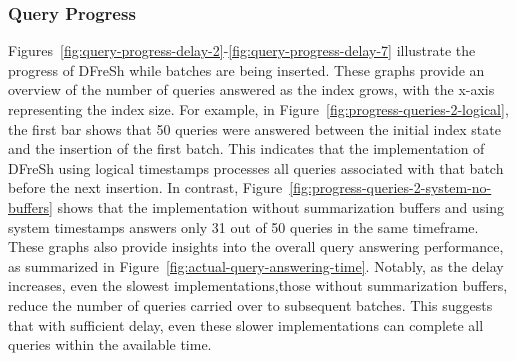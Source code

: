 \subsubsection{Query Progress}
Figures~\ref{fig:query-progress-delay-2}-\ref{fig:query-progress-delay-7} illustrate
the progress of DFreSh while batches are being inserted. These graphs provide an overview
of the number of queries answered as the index grows, with the x-axis representing the
index size.
%
For example, in Figure~\ref{fig:progress-queries-2-logical}, the first bar shows
that 50 queries were answered between the initial index state and the insertion of
the first batch. This indicates that the implementation of DFreSh using logical timestamps
processes all queries associated with that batch before the next insertion. In contrast,
Figure~\ref{fig:progress-queries-2-system-no-buffers} shows that the implementation
without summarization buffers and using system timestamps answers only 31 out of 50
queries in the same timeframe.
%
These graphs also provide insights into the overall query answering performance, as
summarized in Figure~\ref{fig:actual-query-answering-time}. Notably, as the delay
increases, even the slowest implementations,those without summarization buffers, reduce
the number of queries carried over to subsequent batches. This suggests that with
sufficient delay, even these slower implementations can complete all queries within
the available time.
